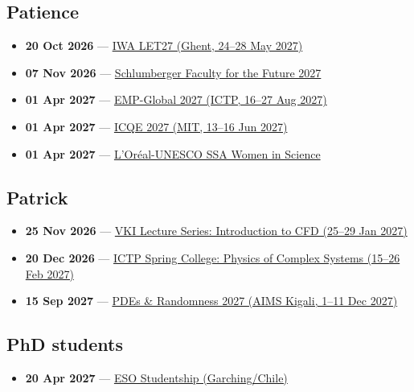 \subsection*{Patience}
\begin{itemize}[leftmargin=1.4em,itemsep=0.1em]
  \item \textbf{20 Oct 2026} --- \href{https://ebnet.ac.uk/iwa-let27-abstracts-deadline/}{IWA LET27 (Ghent, 24--28 May 2027)}
  \item \textbf{07 Nov 2026} --- \href{https://schlumbergerfoundation.com/apply-now/}{Schlumberger Faculty for the Future 2027}
  \item \textbf{01 Apr 2027} --- \href{https://indico.ictp.it/event/11453}{EMP-Global 2027 (ICTP, 16--27 Aug 2027)}
  \item \textbf{01 Apr 2027} --- \href{https://icqe.mit.edu/}{ICQE 2027 (MIT, 13--16 Jun 2027)}
  \item \textbf{01 Apr 2027} --- \href{https://www.fondationloreal.com/our-programs-women-science-national-and-regional-young-talents-programs/sub-saharan-africa-young}{L'Oréal-UNESCO SSA Women in Science}
\end{itemize}

\subsection*{Patrick}
\begin{itemize}[leftmargin=1.4em,itemsep=0.1em]
  \item \textbf{25 Nov 2026} --- \href{https://ls.vki.ac.be/store/lsdetails/229/introduction-to-computational-fluid-dynamics-2027}{VKI Lecture Series: Introduction to CFD (25--29 Jan 2027)}
  \item \textbf{20 Dec 2026} --- \href{https://www.ictp.it/home/scientific-calendar}{ICTP Spring College: Physics of Complex Systems (15--26 Feb 2027)}
  \item \textbf{15 Sep 2027} --- \href{https://sy-m.org/pdes-and-randomness.html}{PDEs \& Randomness 2027 (AIMS Kigali, 1--11 Dec 2027)}
\end{itemize}

\subsection*{PhD students}
\begin{itemize}[leftmargin=1.4em,itemsep=0.1em]
  \item \textbf{20 Apr 2027} --- \href{http://www.hq.eso.org/sci/activities/fellowships-and-studentships/FeSt-overview.html}{ESO Studentship (Garching/Chile)}
\end{itemize}

